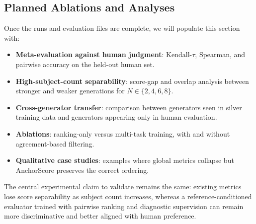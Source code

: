 \subsection{Planned Ablations and Analyses}
Once the runs and evaluation files are complete, we will populate this section with:
\begin{itemize}
    \item \textbf{Meta-evaluation against human judgment}: Kendall-$\tau$, Spearman, and pairwise accuracy on the held-out human set.
    \item \textbf{High-subject-count separability}: score-gap and overlap analysis between stronger and weaker generations for $N \in \{2,4,6,8\}$.
    \item \textbf{Cross-generator transfer}: comparison between generators seen in silver training data and generators appearing only in human evaluation.
    \item \textbf{Ablations}: ranking-only versus multi-task training, with and without agreement-based filtering.
    \item \textbf{Qualitative case studies}: examples where global metrics collapse but AnchorScore preserves the correct ordering.
\end{itemize}

The central experimental claim to validate remains the same: existing metrics lose score separability as subject count increases, whereas a reference-conditioned evaluator trained with pairwise ranking and diagnostic supervision can remain more discriminative and better aligned with human preference.

